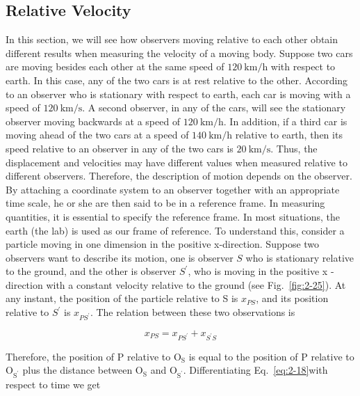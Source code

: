 \documentclass[10pt]{article}
\numberwithin{equation}{section}
\begin{document}
\subsection{Relative Velocity}\label{sec:2-5}
In this section, we will see how observers moving relative to each other obtain different results when measuring the velocity of a moving body. Suppose two cars are moving besides each other at the same speed of $120 \mathrm{~km} / \mathrm{h}$ with respect to earth. In this case, any of the two cars is at rest relative to the other. According to an observer who is stationary with respect to earth, each car is moving with a speed of $120 \mathrm{~km} / \mathrm{s}$. A second observer, in any of the cars, will see the stationary observer moving backwards at a speed of $120 \mathrm{~km} / \mathrm{h}$. In addition, if a third car is moving ahead of the two cars at a speed of $140 \mathrm{~km} / \mathrm{h}$ relative to earth, then its speed relative to an observer in any of the two cars is $20 \mathrm{~km} / \mathrm{s}$. Thus, the displacement and velocities may have different values when measured relative to different observers. Therefore, the description of motion depends on the observer. By attaching a coordinate system to an observer together with an appropriate time scale, he or she are then said to be in a reference frame. In measuring quantities, it is essential to specify the reference frame. In most situations, the earth (the lab) is used as our frame of reference. To understand this, consider a particle moving in one dimension in the positive x-direction. Suppose two observers want to describe its motion, one is observer $S$ who is stationary relative to the ground, and the other is observer $S^{\prime}$, who is moving in the positive x -direction with a constant velocity relative to the ground (see Fig.~\ref{fig:2-25}). At any instant, the position of the particle relative to S is $x_{P S}$, and its position relative to $S^{\prime}$ is $x_{P S^{\prime}}$. The relation between these two observations is


\begin{equation}
x_{P S}=x_{P S^{\prime}}+x_{S^{\prime} S} \label{eq:2-18}
\end{equation}


Therefore, the position of P relative to $\mathrm{O}_{\mathrm{S}}$ is equal to the position of P relative to $\mathrm{O}_{\mathrm{S}^{\prime}}$ plus the distance between $\mathrm{O}_{\mathrm{S}}$ and $\mathrm{O}_{\mathrm{S}^{\prime}}$. Differentiating Eq.~\eqref{eq:2-18}with respect to time we get
\end{document}
